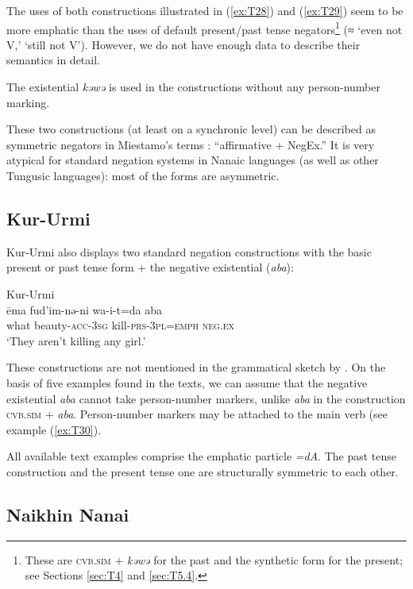 \documentclass[output=paper]{langscibook}
\begin{document}
The uses of both constructions illustrated in (\ref{ex:T28}) and (\ref{ex:T29}) seem to be more emphatic than the uses of default present/past tense negators\footnote{These are \textsc{cvb.sim} + \textit{kəwə} for the past and the synthetic form  for the present; see Sections \ref{sec:T4} and \ref{sec:T5.4}.} (≈ ‘even not V,’ ‘still not V’). However, we do not have enough data to describe their semantics in detail.

The existential \textit{kəwə} is used in the constructions without any person-number marking.

These two constructions (at least on a synchronic level) can be described as symmetric negators in Miestamo’s terms \citeyearpar{Miestamo2005}: “affirmative + NegEx.” It is very atypical for standard negation systems in Nanaic languages (as well as other Tungusic languages): most of the forms are asymmetric.

\subsection{Kur-Urmi}\label{sec:T6.3}

Kur-Urmi also displays two standard negation constructions with the basic present or past tense form + the negative existential (\textit{aba}):

\ea Kur-Urmi \label{ex:T30}\\
	\gll ēma	fud’im-nə-ni	wa-i-t=da	aba\\
	what	beauty-\textsc{acc-3sg}	kill-\textsc{prs-3pl=emph}	\textsc{neg.ex}\\
	\glt `They aren’t killing any girl.' \citep[141, text]{sunik1958a}
\z

These constructions are not mentioned in the grammatical sketch by \citet{sunik1958a}. On the basis of five examples found in the texts, we can assume that the negative existential \textit{aba} cannot take person-number markers, unlike \textit{aba} in the construction \textsc{cvb.sim} + \textit{aba}. Person-number markers may be attached to the main verb (see example (\ref{ex:T30}).

All available text examples comprise the emphatic particle \textit{=dA}. The past tense construction and the present tense one are structurally symmetric to each other.

\subsection{Naikhin Nanai}\label{sec:T6.4}
\end{document}
